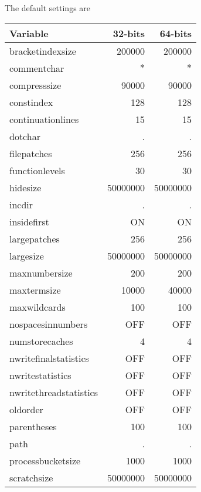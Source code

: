 The default settings are
\begin{center}
\begin{tabular}{lrr}
Variable         &      32-bits       &    64-bits   \\ \hline
bracketindexsize &      200000        & 200000 \\
commentchar &           $*$           & $*$ \\
compresssize &          90000         & 90000 \\
constindex &            128           & 128 \\
continuationlines &     15            & 15 \\
dotchar &               .             & . \\
filepatches &           256           & 256 \\
functionlevels &        30            & 30 \\
hidesize &              50000000      & 50000000 \\
incdir &                .             & . \\
insidefirst &           ON            & ON \\
largepatches &          256           & 256 \\
largesize &             50000000      & 50000000 \\
maxnumbersize &         200           & 200 \\
maxtermsize &           10000         & 40000 \\
maxwildcards &          100           & 100 \\
nospacesinnumbers &     OFF           & OFF \\
numstorecaches &        4             & 4 \\
nwritefinalstatistics & OFF           & OFF \\
nwritestatistics &      OFF           & OFF \\
nwritethreadstatistics &OFF           & OFF \\
oldorder &              OFF           & OFF \\
parentheses &           100           & 100 \\
path &                  .             & . \\
processbucketsize &     1000          & 1000 \\
scratchsize &           50000000      & 50000000 \\

\end{tabular}
\end{center}
